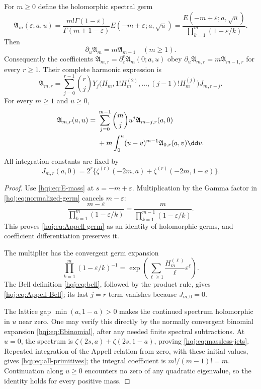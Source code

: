 \begin{theorem}
\label{hqj:thm:Appell}
For $m\ge0$ define the holomorphic spectral germ
\begin{equation}\label{hqj:eq:normalized-germ}
\mathfrak A_m(\varepsilon;a,u)
=\frac{m!\Gamma(1-\varepsilon)}{\Gamma(m+1-\varepsilon)}
E(-m+\varepsilon;a,\sqrt u)
=\frac{E(-m+\varepsilon;a,\sqrt u)}
{\prod_{k=1}^m(1-\varepsilon/k)}.
\end{equation}
Then
\begin{equation}\label{hqj:eq:Appell-germ}
\partial_u\mathfrak A_m=m\mathfrak A_{m-1}\quad(m\ge1).
\end{equation}
Consequently the coefficients
$\mathfrak A_{m,r}=\partial_\varepsilon^r\mathfrak A_m(0;a,u)$ obey
$\partial_u\mathfrak A_{m,r}=m\mathfrak A_{m-1,r}$ for every $r\ge1$.
Their complete harmonic expression is
\begin{equation}\label{hqj:eq:Appell-Bell}
\mathfrak A_{m,r}
=\sum_{j=0}^{r-1}\binom rj
Y_j\bigl(H_m,1!H_m^{(2)},\ldots,(j-1)!H_m^{(j)}\bigr)
J_{m,r-j}.
\end{equation}
For every $m\ge1$ and $u\ge0$,
\begin{align}
\mathfrak A_{m,r}(a,u)
={}&\sum_{j=0}^{m-1}\binom mj u^j\mathfrak A_{m-j,r}(a,0)
\notag\\
&+m\int_0^u(u-v)^{m-1}\mathfrak A_{0,r}(a,v)\dd v.
\label{hqj:eq:all-primitives}
\end{align}
All integration constants are fixed by
\begin{equation}\label{hqj:eq:massless-jets}
J_{m,r}(a,0)=2^r\bigl\{\zeta^{(r)}(-2m,a)
+\zeta^{(r)}(-2m,1-a)\bigr\}.
\end{equation}
\end{theorem}
\begin{proof}
Use \eqref{hqj:eq:E-mass} at $s=-m+\varepsilon$. Multiplication by the
Gamma factor in \eqref{hqj:eq:normalized-germ} cancels $m-\varepsilon$:
\[
\frac{m-\varepsilon}{\prod_{k=1}^m(1-\varepsilon/k)}
=\frac{m}{\prod_{k=1}^{m-1}(1-\varepsilon/k)}.
\]
This proves \eqref{hqj:eq:Appell-germ} as an identity of holomorphic
germs, and coefficient differentiation preserves it.

The multiplier has the convergent germ expansion
\[
\prod_{k=1}^m(1-\varepsilon/k)^{-1}
=\exp\left(\sum_{\ell\ge1}\frac{H_m^{(\ell)}}\ell
\varepsilon^\ell\right).
\]
The Bell definition \eqref{hqj:eq:bell}, followed by the product rule,
gives \eqref{hqj:eq:Appell-Bell}; its last $j=r$ term vanishes because
$J_{m,0}=0$.

The lattice gap $\min(a,1-a)>0$ makes the continued spectrum holomorphic
in $u$ near zero. One may verify this directly by the normally
convergent binomial expansion \eqref{hqj:eq:Ebinomial}, after any
needed finite spectral subtractions. At $u=0$, the spectrum is
$\zeta(2s,a)+\zeta(2s,1-a)$, proving
\eqref{hqj:eq:massless-jets}. Repeated integration of the Appell
relation from zero, with these initial values, gives
\eqref{hqj:eq:all-primitives}; the integral coefficient is
$m!/(m-1)!=m$. Continuation along $u\ge0$ encounters no zero of any
quadratic eigenvalue, so the identity holds for every positive mass.
\end{proof}

